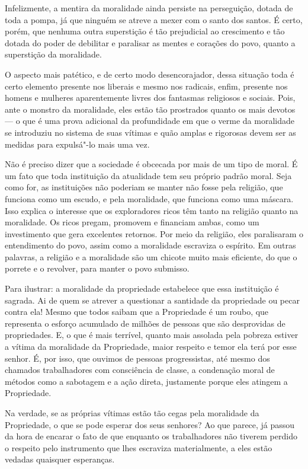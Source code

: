 Infelizmente, a mentira da moralidade ainda persiste na perseguição,
dotada de toda a pompa, já que ninguém se atreve a mexer com o santo dos
santos. É certo, porém, que nenhuma outra superstição é tão prejudicial
ao crescimento e tão dotada do poder de debilitar e paralisar as mentes
e corações do povo, quanto a superstição da moralidade.

O aspecto mais patético, e de certo modo desencorajador, dessa situação
toda é certo elemento presente nos liberais e mesmo nos radicais, enfim,
presente nos homens e mulheres aparentemente livres dos fantasmas
religiosos e sociais. Pois, ante o monstro da moralidade, eles estão tão
prostrados quanto os mais devotos --- o que é uma prova adicional da
profundidade em que o verme da moralidade se introduziu no sistema de
suas vítimas e quão amplas e rigorosas devem ser as medidas para
expulsá"-lo mais uma vez.

Não é preciso dizer que a sociedade é obcecada por mais de um tipo de
moral. É um fato que toda instituição da atualidade tem seu próprio
padrão moral. Seja como for, as instituições não poderiam se manter não\label{ref8}
fosse pela religião, que funciona como um escudo, e pela moralidade, que
funciona como uma máscara. Isso explica o interesse que os exploradores
ricos têm tanto na religião quanto na moralidade. Os ricos pregam,
promovem e financiam ambas, como um investimento que gera excelentes
retornos. Por meio da religião, eles paralisaram o entendimento do povo,
assim como a moralidade escraviza o espírito. Em outras palavras, a
religião e a moralidade são um chicote muito mais eficiente, do que o
porrete e o revolver, para manter o povo submisso.

Para ilustrar: a moralidade da propriedade estabelece que essa
instituição é sagrada. Ai de quem se atrever a questionar a santidade da
propriedade ou pecar contra ela! Mesmo que todos saibam que a
Propriedade é um roubo, que representa o esforço acumulado de milhões de
pessoas que são desprovidas de propriedades. E, o que é mais terrível,
quanto mais assolada pela pobreza estiver a vítima da moralidade da
Propriedade, maior respeito e temor ela terá por esse senhor. É, por
isso, que ouvimos de pessoas progressistas, até mesmo dos chamados
trabalhadores com consciência de classe, a condenação moral de métodos
como a sabotagem e a ação direta, justamente porque eles atingem a
Propriedade.

Na verdade, se as próprias vítimas estão tão cegas pela moralidade da
Propriedade, o que se pode esperar dos seus senhores? Ao que parece, já
passou da hora de encarar o fato de que enquanto os trabalhadores não
tiverem perdido o respeito pelo instrumento que lhes escraviza
materialmente, a eles estão vedadas quaisquer esperanças.

